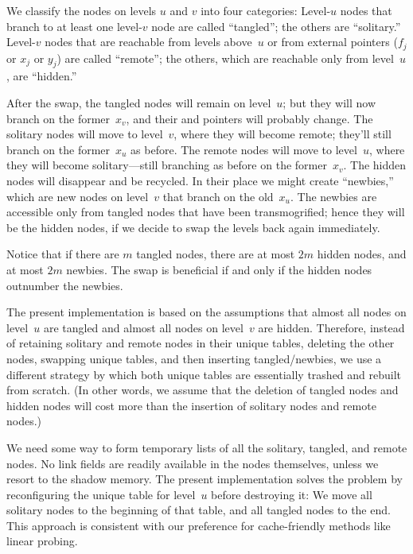 We classify the nodes on levels $u$ and $v$ into four categories:
Level-$u$ nodes that branch to at least one level-$v$ node are called
``tangled''; the others are ``solitary.'' Level-$v$ nodes that are
reachable from levels above~$u$ or from external pointers ($f_j$ or
$x_j$ or $y_j$) are called ``remote''; the others, which are reachable
only from level~$u$, are ``hidden.''

After the swap, the tangled nodes will remain on level~$u$; but they
will now branch on the former~$x_v$, and their  and 
pointers
will probably change. The solitary nodes will move to
level~$v$, where they will become remote; they'll still branch
on the former~$x_u$ as before.
The remote nodes will move to level~$u$, where they will become
solitary---still branching as before on the former~$x_v$.
The hidden nodes will
disappear and be recycled. In their place we might create ``newbies,''
which are new nodes on level~$v$ that branch on the old~$x_u$.
The newbies are accessible only from tangled nodes that have been
transmogrified; hence they will be
the hidden nodes, if we decide to swap the levels back again immediately.

Notice that if there are $m$ tangled nodes, there are at most $2m$
hidden nodes, and at most $2m$ newbies. The swap is beneficial if and
only if the hidden nodes outnumber the newbies.

The present implementation
is based on the assumptions that almost all nodes on level~$u$
are tangled and almost all nodes on level~$v$ are hidden.
Therefore, instead of retaining solitary and remote nodes in their unique
tables, deleting the other nodes, swapping unique tables, and then inserting
tangled/newbies, we use a different strategy by which both unique tables
are essentially trashed and rebuilt from scratch. (In other words,
we assume that the deletion of
tangled nodes and hidden nodes will cost more than the insertion of
solitary nodes and remote nodes.)

We need some way to form temporary lists of all the solitary, tangled, and
remote nodes. No link fields are readily available in the nodes themselves,
unless we resort to the shadow memory.
The present implementation solves the problem by reconfiguring
the unique table for level~$u$ before destroying it: We move
all solitary nodes to the beginning of that table, and all tangled
nodes to the end. This approach is consistent with our preference for
cache-friendly methods like linear probing.


